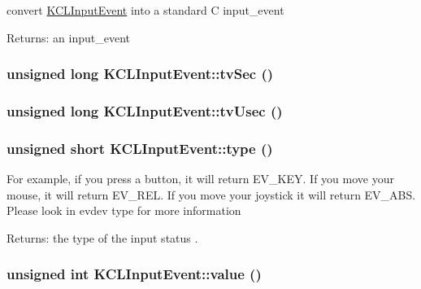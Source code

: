 convert \hyperlink{class_k_c_l_input_event}{KCLInputEvent} into a standard C input\_\-event \begin{Desc}
\item[Returns:]an input\_\-event \end{Desc}
\hypertarget{class_k_c_l_input_event_e62fcf6dbfebdb826f030a42324f9112}{
\subsubsection[{tvSec}]{\setlength{\rightskip}{0pt plus 5cm}unsigned long KCLInputEvent::tvSec ()}}
\label{class_k_c_l_input_event_e62fcf6dbfebdb826f030a42324f9112}


\hypertarget{class_k_c_l_input_event_2bf3d985ad387f9a1afbd998f42072be}{
\subsubsection[{tvUsec}]{\setlength{\rightskip}{0pt plus 5cm}unsigned long KCLInputEvent::tvUsec ()}}
\label{class_k_c_l_input_event_2bf3d985ad387f9a1afbd998f42072be}


\hypertarget{class_k_c_l_input_event_78e5404404a0874ba2c8272f366f0695}{
\subsubsection[{type}]{\setlength{\rightskip}{0pt plus 5cm}unsigned short KCLInputEvent::type ()}}
\label{class_k_c_l_input_event_78e5404404a0874ba2c8272f366f0695}


For example, if you press a button, it will return EV\_\-KEY. If you move your mouse, it will return EV\_\-REL. If you move your joystick it will return EV\_\-ABS. Please look in evdev type for more information \begin{Desc}
\item[Returns:]the type of the input status . \end{Desc}
\hypertarget{class_k_c_l_input_event_21b5263ab33ebb4725ffa93f7ededba6}{
\subsubsection[{value}]{\setlength{\rightskip}{0pt plus 5cm}unsigned int KCLInputEvent::value ()}}
\label{class_k_c_l_input_event_21b5263ab33ebb4725ffa93f7ededba6}


